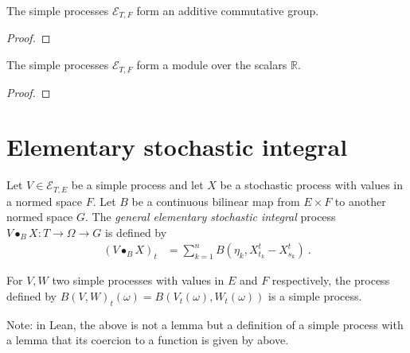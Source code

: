 \begin{lemma}\label{lem:addCommGroup_simpleProcess}
  \leanok
The simple processes $\mathcal{E}_{T, F}$ form an additive commutative group.
\end{lemma}

\begin{proof}
  \leanok
\end{proof}


\begin{lemma}\label{lem:module_simpleProcess}
  \leanok
The simple processes $\mathcal{E}_{T, F}$ form a module over the scalars $\mathbb{R}$.
\end{lemma}

\begin{proof}
  \leanok
\end{proof}

\section{Elementary stochastic integral}

\begin{definition}\label{def:elemStochIntegralBilin}
  \leanok
Let $V \in \mathcal{E}_{T, E}$ be a simple process and let $X$ be a stochastic process with values in a normed space $F$.
Let $B$ be a continuous bilinear map from $E \times F$ to another normed space $G$.
The \emph{general elementary stochastic integral} process $V \bullet_B X : T \to \Omega \to G$ is defined by
\begin{align*}
  (V \bullet_B X)_t
  &= \sum_{k=1}^{n} B (\eta_k, X^t_{t_k} - X^t_{s_k})
  \: .
\end{align*}
\end{definition}


\begin{lemma}\label{lem:simpleProcess_map2}
  \leanok
For $V, W$ two simple processes with values in $E$ and $F$ respectively, the process defined by $B(V, W)_t(\omega) = B(V_t(\omega), W_t(\omega))$ is a simple process.

Note: in Lean, the above is not a lemma but a definition of a simple process with a lemma that its coercion to a function is given by above.
\end{lemma}

